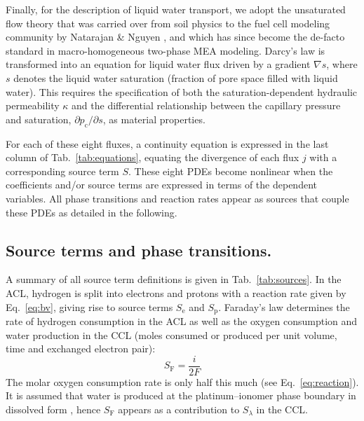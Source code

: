 \documentclass[fontsize=9pt,DIV=calc,a4paper,twocolumn]{scrartcl}
\begin{document}
Finally, for the description of liquid water transport, we adopt the unsaturated flow theory that was carried over from soil physics to the fuel cell modeling community by Natarajan \& Nguyen \cite{natarajan:01}, and which has since become the de-facto standard in macro-homogeneous two-phase MEA modeling. Darcy's law is transformed into an equation for liquid water flux driven by a gradient $\nabla s$, where $s$ denotes the liquid water saturation (fraction of pore space filled with liquid water). This requires the specification of both the saturation-dependent hydraulic permeability $\kappa$ and the differential relationship between the capillary pressure and saturation, $\partial p_\mathrm{c}/\partial s$, as material properties.

For each of these eight fluxes, a continuity equation is expressed in the last column of Tab.~\ref{tab:equations}, equating the divergence of each flux $j$ with a corresponding source term $S$. These eight PDEs become nonlinear when the coefficients and/or source terms are expressed in terms of the dependent variables. All phase transitions and reaction rates appear as sources that couple these PDEs as detailed in the following.

\subsection*{Source terms and phase transitions.}

A summary of all source term definitions is given in Tab.~\ref{tab:sources}. In the ACL, hydrogen is split into electrons and protons with a reaction rate given by Eq.~\ref{eq:bv}, giving rise to source terms $S_\mathrm{e}$ and $S_\mathrm{p}$. Faraday's law determines the rate of hydrogen consumption in the ACL as well as the oxygen consumption and water production in the CCL (moles consumed or produced per unit volume, time and exchanged electron pair):
%
\begin{equation}
S_\mathrm{F} = \frac{i}{2F}
\end{equation}
%
The molar oxygen consumption rate is only half this much (see Eq.~\ref{eq:reaction}). It is assumed that water is produced at the platinum--ionomer phase boundary in dissolved form \cite{wu:09b}, hence $S_\mathrm{F}$ appears as a contribution to $S_\lambda$ in the CCL.
\end{document}
